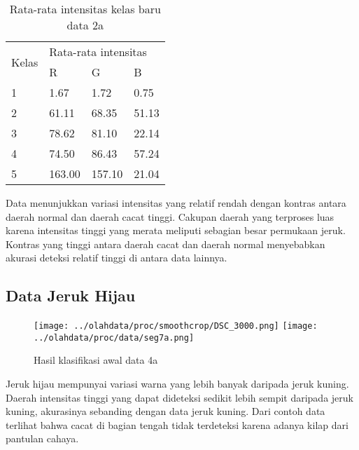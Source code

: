 \documentclass[laporan.tex]{subfiles}
\begin{document}
\begin{table}[h!]
\centering
\begin{tabular}{|l|l|l|l|}
\cline{1-4}
\multirow{2}{*}{Kelas} & \multicolumn{3}{l|}{Rata-rata intensitas} \\
\cline{2-4}
 & R & G & B \\
\cline{1-4}
1 & 1.67 & 1.72 & 0.75 \\
2 & 61.11 & 68.35 & 51.13 \\
3 & 78.62 & 81.10 & 22.14 \\
4 & 74.50 & 86.43 & 57.24 \\
5 & 163.00 & 157.10 & 21.04 \\
\cline{1-4}
\end{tabular}
\caption[]{Rata-rata intensitas kelas baru data 2a}
\label{table:avgyellow2}
\end{table}

Data menunjukkan variasi intensitas yang relatif rendah dengan kontras antara daerah normal dan daerah cacat tinggi. Cakupan daerah yang terproses luas karena intensitas tinggi yang merata meliputi sebagian besar permukaan jeruk. Kontras yang tinggi antara daerah cacat dan daerah normal menyebabkan akurasi deteksi relatif tinggi di antara data lainnya.

\FloatBarrier
\subsection{Data Jeruk Hijau}

\begin{figure}[h!]
\centering
\texttt{[image: ../olahdata/proc/smoothcrop/DSC\_3000.png]}
\texttt{[image: ../olahdata/proc/data/seg7a.png]}
\caption[]{Hasil klasifikasi awal data 4a}
\end{figure}

Jeruk hijau mempunyai variasi warna yang lebih banyak daripada jeruk kuning. Daerah intensitas tinggi yang dapat dideteksi sedikit lebih sempit daripada jeruk kuning, akurasinya sebanding dengan data jeruk kuning. Dari contoh data terlihat bahwa cacat di bagian tengah tidak terdeteksi karena adanya kilap dari pantulan cahaya.
\end{document}
